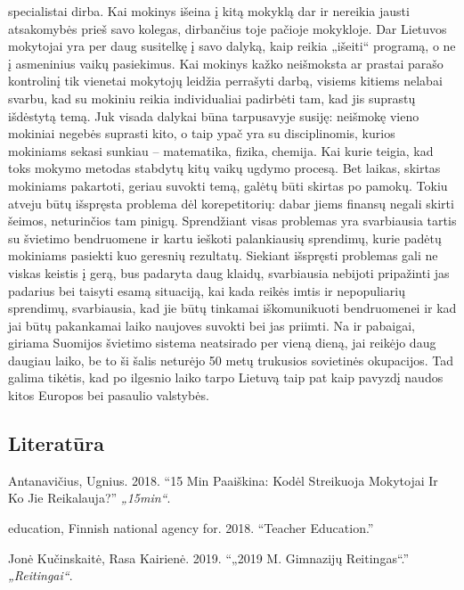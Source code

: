 \documentclass[]{article}
\begin{document}
specialistai dirba. Kai mokinys išeina į kitą mokyklą dar ir nereikia
jausti atsakomybės prieš savo kolegas, dirbančius toje pačioje
mokykloje. Dar Lietuvos mokytojai yra per daug susitelkę į savo dalyką,
kaip reikia „išeiti`` programą, o ne į asmeninius vaikų pasiekimus. Kai
mokinys kažko neišmoksta ar prastai parašo kontrolinį tik vienetai
mokytojų leidžia perrašyti darbą, visiems kitiems nelabai svarbu, kad su
mokiniu reikia individualiai padirbėti tam, kad jis suprastų išdėstytą
temą. Juk visada dalykai būna tarpusavyje susiję: neišmokę vieno
mokiniai negebės suprasti kito, o taip ypač yra su disciplinomis, kurios
mokiniams sekasi sunkiau -- matematika, fizika, chemija. Kai kurie
teigia, kad toks mokymo metodas stabdytų kitų vaikų ugdymo procesą. Bet
laikas, skirtas mokiniams pakartoti, geriau suvokti temą, galėtų būti
skirtas po pamokų. Tokiu atveju būtų išspręsta problema dėl
korepetitorių: dabar jiems finansų negali skirti šeimos, neturinčios tam
pinigų. Sprendžiant visas problemas yra svarbiausia tartis su švietimo
bendruomene ir kartu ieškoti palankiausių sprendimų, kurie padėtų
mokiniams pasiekti kuo geresnių rezultatų. Siekiant išspręsti problemas
gali ne viskas keistis į gerą, bus padaryta daug klaidų, svarbiausia
nebijoti pripažinti jas padarius bei taisyti esamą situaciją, kai kada
reikės imtis ir nepopuliarių sprendimų, svarbiausia, kad jie būtų
tinkamai iškomunikuoti bendruomenei ir kad jai būtų pakankamai laiko
naujoves suvokti bei jas priimti. Na ir pabaigai, giriama Suomijos
švietimo sistema neatsirado per vieną dieną, jai reikėjo daug daugiau
laiko, be to ši šalis neturėjo 50 metų trukusios sovietinės okupacijos.
Tad galima tikėtis, kad po ilgesnio laiko tarpo Lietuvą taip pat kaip
pavyzdį naudos kitos Europos bei pasaulio valstybės.

\subsection*{Literatūra}\label{literatura}

\hypertarget{refs}{}
\hypertarget{ref-ugniusantanaviux10dius2018}{}
Antanavičius, Ugnius. 2018. ``15 Min Paaiškina: Kodėl Streikuoja
Mokytojai Ir Ko Jie Reikalauja?'' \emph{„15min``}.

\hypertarget{ref-finnishnationalagencyforeducation2018}{}
education, Finnish national agency for. 2018. ``Teacher Education.''

\hypertarget{ref-jonux117kuux10dinskaitux117rasakairienux1172019}{}
Jonė Kučinskaitė, Rasa Kairienė. 2019. ``„2019 M. Gimnazijų
Reitingas``.'' \emph{„Reitingai``}.
\end{document}
